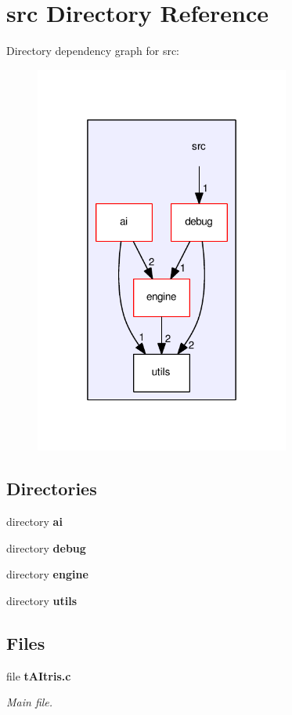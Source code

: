 \section{src Directory Reference}
\label{dir_68267d1309a1af8e8297ef4c3efbcdba}
Directory dependency graph for src\+:
\nopagebreak
\begin{figure}[H]
\begin{center}
\leavevmode
\includegraphics[width=238pt]{dir_68267d1309a1af8e8297ef4c3efbcdba_dep}
\end{center}
\end{figure}
\subsection*{Directories}
\begin{DoxyCompactItemize}
\item 
directory \textbf{ ai}
\item 
directory \textbf{ debug}
\item 
directory \textbf{ engine}
\item 
directory \textbf{ utils}
\end{DoxyCompactItemize}
\subsection*{Files}
\begin{DoxyCompactItemize}
\item 
file \textbf{ t\+A\+Itris.\+c}
\begin{DoxyCompactList}\small\item\em Main file. \end{DoxyCompactList}\end{DoxyCompactItemize}
